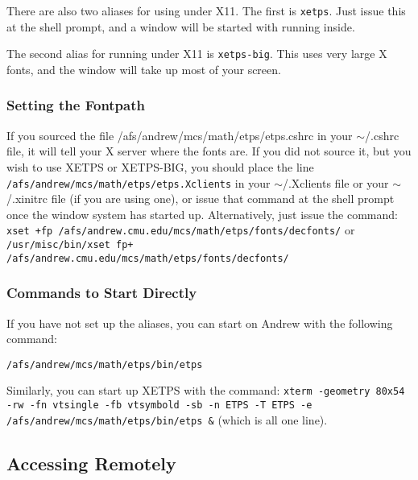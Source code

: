 \documentclass{article}
\begin{document}
There are also two aliases for using {\ETPS}
under X11.  The first is {\tt xetps}.  Just issue this at the shell prompt,
and a window will be started with {\ETPS} running inside. 

The second alias for running {\ETPS} under X11 is {\tt xetps-big}.  This uses
very large X fonts, and the window will take up most of your screen.

\subsubsection{Setting the Fontpath}

If you sourced the file /afs/andrew/mcs/math/etps/etps.cshrc in your
$\sim$/.cshrc file, it will tell your X server where the fonts are.  
If you did not source it, but you wish to use XETPS or XETPS-BIG,
you should place the line\newline
\verb=/afs/andrew/mcs/math/etps/etps.Xclients=\newline
in your $\sim$/.Xclients
file 
 or your $\sim$/.xinitrc file
(if you are using one), or issue that command at the shell prompt once
the window system has started up.
Alternatively, just issue the command:\newline{}
{\tt xset +fp /afs/andrew.cmu.edu/mcs/math/etps/fonts/decfonts/}\newline{}
or\newline{}
{\tt /usr/misc/bin/xset fp+ /afs/andrew.cmu.edu/mcs/math/etps/fonts/decfonts/}

\pagebreak


\subsubsection{Commands to Start {\ETPS} Directly}

If you have not set up the aliases, you can start 
{\ETPS} on Andrew with the following command:

{\tt /afs/andrew/mcs/math/etps/bin/etps}

Similarly, you can start up XETPS with the command:\newline
{\tt xterm -geometry 80x54 -rw -fn vtsingle -fb vtsymbold -sb -n ETPS -T ETPS -e \newline
/afs/andrew/mcs/math/etps/bin/etps \&}\newline
(which is all one line).



\subsection{Accessing {\ETPS} Remotely}
\end{document}
